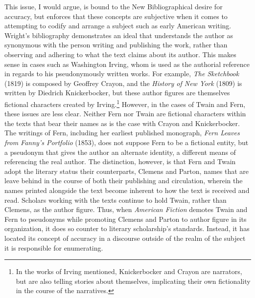 This issue, I would argue, is bound to the New Bibliographical desire for accuracy, but enforces that these concepts are subjective when it comes to attempting to codify and arrange a subject such as early American writing. Wright's bibliography demonstrates an ideal that understands the author as synonymous with the person writing and publishing the work, rather than observing and adhering to what the text claims about its author. This makes sense in cases such as Washington Irving, whom is used as the authorial reference in regards to his pseudonymously written works. For example, \textit{The Sketchbook} (1819) is composed by Geoffrey Crayon, and the \textit{History of New York} (1809) is written by Diedrich Knickerbocker, but these author figures are themselves fictional characters created by Irving.\footnote{In the works of Irving mentioned, Knickerbocker and Crayon are narrators, but are also telling stories about themselves, implicating their own fictionality in the course of the narratives.} However, in the cases of Twain and Fern, these issues are less clear. Neither Fern nor Twain are fictional characters within the texts that bear their names as is the case with Crayon and Knickerbocker. The writings of Fern, including her earliest published monograph, \textit{Fern Leaves from Fanny's Portfolio} (1853), does not suppose Fern to be a fictional entity, but a pseudonym that gives the author an alternate identity, a different means of referencing the real author. The distinction, however, is that Fern and Twain adopt the literary status their counterparts, Clemens and Parton,  names that are leave behind in the course of both their publishing and circulation, wherein the names printed alongside the text become inherent to how the text is received and read. Scholars working with the texts continue to hold Twain, rather than Clemens, as the author figure. Thus, when \textit{American Fiction} demotes Twain and Fern to pseudonyms while promoting Clemens and Parton to author figure in its organization, it does so counter to literary scholarship's standards. Instead, it has located its concept of accuracy in a discourse outside of the realm of the subject it is responsible for enumerating.

